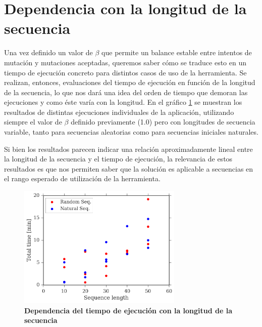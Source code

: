 \section{Dependencia con la longitud de la secuencia}

Una vez definido un valor de $\beta$ que permite un balance estable entre intentos de mutación y mutaciones aceptadas, queremos saber cómo se traduce esto en un tiempo de ejecución concreto para distintos casos de uso de la herramienta.
Se realizan, entonces, evaluaciones del tiempo de ejecución en función de la longitud de la secuencia, lo que nos dará una idea del orden de tiempo que demoran las ejecuciones y como éste varía con la longitud.
En el gráfico \ref{fig:time-vs-length} se muestran los resultados de distintas ejecuciones individuales de la aplicación, utilizando siempre el valor de $\beta$ definido previamente (1.0) pero con longitudes de secuencia variable, 
tanto para secuencias aleatorias como para secuencias iniciales naturales.

Si bien los resultados parecen indicar una relación aproximadamente lineal entre la longitud de la secuencia y el tiempo de ejecución, la relevancia de estos resultados es que nos permiten 
saber que la solución es aplicable a secuencias en el rango esperado de utilización de la herramienta. 

\begin{figure}[htbp]
\centering
\includegraphics[width=0.7\textwidth]{img/resultados/lengthVsTime.png}
\caption{\textbf{Dependencia del tiempo de ejecución con la longitud de la secuencia}}
\label{fig:time-vs-length}
\end{figure}





